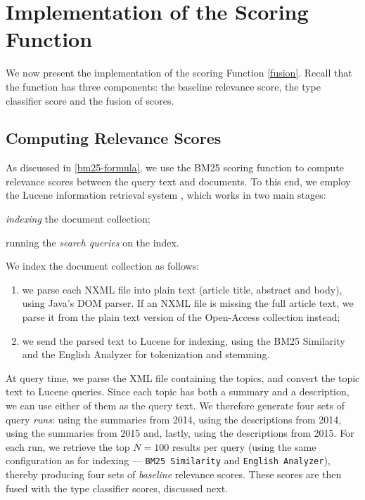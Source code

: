 \section{Implementation of the Scoring Function}
We now present the implementation of the scoring Function \ref{fusion}. Recall that the function has three components:
the baseline relevance score, the type classifier score and the fusion of scores.

\subsection{Computing Relevance Scores}\label{sim-impl}
As discussed in \ref{bm25-formula}, we use the \textsf{BM25} scoring function to compute relevance scores between the query
text and documents. To this end, we employ the Lucene information retrieval system \cite{lucene}, which works in two main stages:
\begin{enumerate*}[label=\arabic*)]
 \item \emph{indexing} the document collection;
 \item running the \emph{search queries} on the index.
\end{enumerate*}

We index the document collection as follows:
\begin{enumerate}[label=\arabic*)]
 \item we parse each NXML file into plain text (article title, abstract and body), using Java's DOM parser.
  If an NXML file is missing the full article text, we parse it from the plain text version of the Open-Access collection instead;
 \item we send the parsed text to Lucene for indexing,
    using the BM25 Similarity and the English Analyzer for tokenization and stemming.
\end{enumerate}

At query time, we parse the XML file containing the topics, and convert the topic text to Lucene queries.
Since each topic has both a summary and a description, we can use either of them as the query text.
We therefore
generate four sets of query \emph{runs}: using the summaries from 2014, using the descriptions from 2014, using the summaries from 2015 and,
lastly, using the descriptions from 2015.
For each run, we retrieve the top $N=100$ results per query
(using the same configuration as for indexing --- \texttt{BM25 Similarity} and \texttt{English Analyzer}),
thereby producing four sets of \emph{baseline} relevance scores.
These scores are then fused with the type classifier scores, discussed next.

